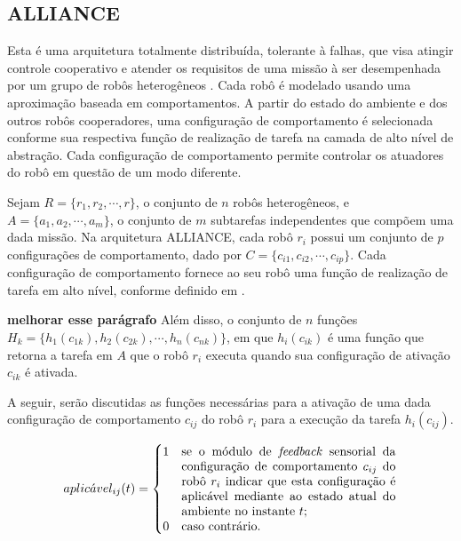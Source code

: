         \subsection{ALLIANCE} \label{sub:sub3_3_1}
        
            Esta é uma arquitetura totalmente distribuída, tolerante à falhas, que visa atingir controle cooperativo e atender os requisitos de uma missão à ser desempenhada por um grupo de robôs heterogêneos \cite{ref:parker1998alliance}. Cada robô é modelado usando uma aproximação baseada em comportamentos. A partir do estado do ambiente e dos outros robôs cooperadores, uma configuração de comportamento é selecionada conforme sua respectiva função de realização de tarefa na camada de alto nível de abstração. Cada configuração de comportamento permite controlar os atuadores do robô em questão de um modo diferente.
            
            Sejam $R=\{r_1, r_2, \cdots, r\}$, o conjunto de $n$ robôs heterogêneos, e $A=\{a_1,a_2, \cdots,\allowbreak a_m\}$, o conjunto de $m$ subtarefas independentes que compõem uma dada missão. Na arquitetura ALLIANCE, cada robô $r_i$ possui um conjunto de $p$ configurações de comportamento, dado por $C=\{c_{i1}, c_{i2},\cdots, c_{ip}\}$. Cada configuração de comportamento fornece ao seu robô uma função de realização de tarefa em alto nível, conforme definido em \cite{ref:brooks1986robust}. 
            
            \textbf{melhorar esse parágrafo} Além disso, o conjunto de $n$ funções $H_k=\{h_1(c_{1k}),\allowbreak h_2(c_{2k}), \cdots, h_n(c_{nk})\}$, em que $h_i(c_{ik})$ é uma função que retorna a tarefa em $A$ que o robô $r_i$ executa quando sua configuração de ativação $c_{ik}$ é ativada.
            
            A seguir, serão discutidas as funções necessárias para a ativação de uma dada configuração de comportamento $c_{ij}$ do robô $r_i$ para a execução da tarefa $h_i(c_{ij})$.
            
            \begin{equation}
                aplic\acute{a}vel_{ij}(t) =
                \begin{cases}
                    1 & \parbox[t]{.5\textwidth}{se o módulo de \textit{feedback} sensorial da configuração de comportamento $c_{ij}$ do robô $r_i$ indicar que esta configuração é aplicável mediante ao estado atual do ambiente no instante $t$;} \\
                    0 & \text{caso contrário.}
                \end{cases}
            \end{equation}
            
